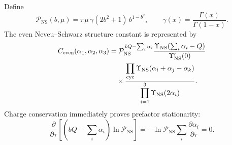 \documentclass[11pt,letterpaper]{article}
\theoremstyle{plain}
\begin{document}
Define
\begin{equation}
\label{eq:appendix-c-ns-prefactor}
 \mathcal P_{\text{NS}}(b,\mu)
 =
 \pi\mu\,
 \gamma(2b^2+1)\,
 b^{1-b^2},
 \qquad
 \gamma(x)=\frac{\Gamma(x)}{\Gamma(1-x)}.
\end{equation}
The even Neveu--Schwarz structure constant is represented by
\begin{align}
\label{eq:appendix-c-even-coupling}
 C_{\text{even}}(\alpha_1,\alpha_2,\alpha_3)
 &=
 \mathcal P_{\text{NS}}^{\,bQ-\sum_i\alpha_i}
 \frac{
 \Upsilon_{\text{NS}}\!\left(\sum_i\alpha_i-Q\right)
 }{
 \Upsilon_{\text{NS}}'(0)
 }
 \notag\\
 &\quad\times
 \frac{
 \displaystyle
 \prod_{\mathrm{cyc}}
 \Upsilon_{\text{NS}}(\alpha_i+\alpha_j-\alpha_k)
 }{
 \displaystyle
 \prod_{i=1}^{3}\Upsilon_{\text{NS}}(2\alpha_i)
 }.
\end{align}
Charge conservation immediately proves prefactor stationarity:
\begin{equation}
\label{eq:appendix-c-prefactor-stationarity}
 \frac{\partial}{\partial\tau}
 \left[
 \left(bQ-\sum_i\alpha_i\right)
 \ln\mathcal P_{\text{NS}}
 \right]
 =
 -\ln\mathcal P_{\text{NS}}
 \sum_i\frac{\partial\alpha_i}{\partial\tau}
 =
 0.
\end{equation}
\end{document}
